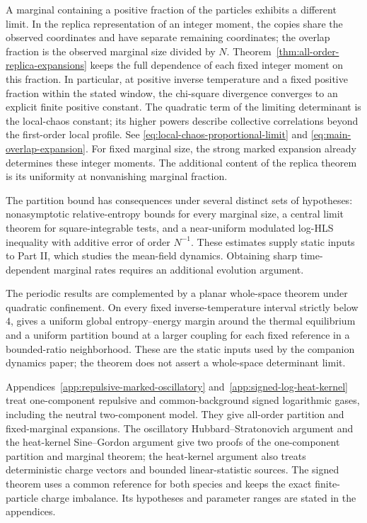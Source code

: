 \documentclass[11pt,reqno]{amsart}
\numberwithin{equation}{section}
\theoremstyle{plain}
\theoremstyle{definition}
\begin{document}
A marginal containing a positive fraction of the particles exhibits a different limit. In the replica representation of an integer moment, the copies share the observed coordinates and have separate remaining coordinates; the overlap fraction is the observed marginal size divided by $N$. Theorem~\ref{thm:all-order-replica-expansions} keeps the full dependence of each fixed integer moment on this fraction. In particular, at positive inverse temperature and a fixed positive fraction within the stated window, the chi-square divergence converges to an explicit finite positive constant. The quadratic term of the limiting determinant is the local-chaos constant; its higher powers describe collective correlations beyond the first-order local profile. See \eqref{eq:local-chaos-proportional-limit} and \eqref{eq:main-overlap-expansion}. For fixed marginal size, the strong marked expansion already determines these integer moments. The additional content of the replica theorem is its uniformity at nonvanishing marginal fraction.

The partition bound has consequences under several distinct sets of hypotheses: nonasymptotic relative-entropy bounds for every marginal size, a central limit theorem for square-integrable tests, and a near-uniform modulated log-HLS inequality with additive error of order $N^{-1}$. These estimates supply static inputs to Part II, which studies the mean-field dynamics. Obtaining sharp time-dependent marginal rates requires an additional evolution argument.

The periodic results are complemented by a planar whole-space theorem under quadratic confinement. On every fixed inverse-temperature interval strictly below $4$,  gives a uniform global entropy--energy margin around the thermal equilibrium and a uniform partition bound at a larger coupling for each fixed reference in a bounded-ratio neighborhood. These are the static inputs used by the companion dynamics paper; the theorem does not assert a whole-space determinant limit.

Appendices~\ref{app:repulsive-marked-oscillatory} and~\ref{app:signed-log-heat-kernel} treat one-component repulsive and common-background signed logarithmic gases, including the neutral two-component model. They give all-order partition and fixed-marginal expansions. The oscillatory Hubbard--Stratonovich argument and the heat-kernel Sine--Gordon argument give two proofs of the one-component partition and marginal theorem; the heat-kernel argument also treats deterministic charge vectors and bounded linear-statistic sources. The signed theorem uses a common reference for both species and keeps the exact finite-particle charge imbalance. Its hypotheses and parameter ranges are stated in the appendices.
\end{document}
